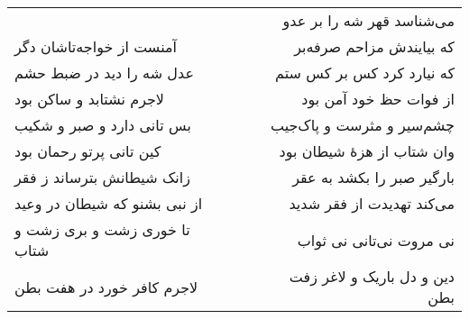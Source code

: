 \begin{center}
\begin{longtable}{l p{0.5cm} r}
&&
می‌شناسد قهر شه را بر عدو
\\
آمنست از خواجه‌تاشان دگر
&&
که بیایندش مزاحم صرفه‌بر
\\
عدل شه را دید در ضبط حشم
&&
که نیارد کرد کس بر کس ستم
\\
لاجرم نشتابد و ساکن بود
&&
از فوات حظ خود آمن بود
\\
بس تانی دارد و صبر و شکیب
&&
چشم‌سیر و مثرست و پاک‌جیب
\\
کین تانی پرتو رحمان بود
&&
وان شتاب از هزهٔ شیطان بود
\\
زانک شیطانش بترساند ز فقر
&&
بارگیر صبر را بکشد به عقر
\\
از نبی بشنو که شیطان در وعید
&&
می‌کند تهدیدت از فقر شدید
\\
تا خوری زشت و بری زشت و شتاب
&&
نی مروت نی‌تانی نی ثواب
\\
لاجرم کافر خورد در هفت بطن
&&
دین و دل باریک و لاغر زفت بطن
\\
\end{longtable}
\end{center}
